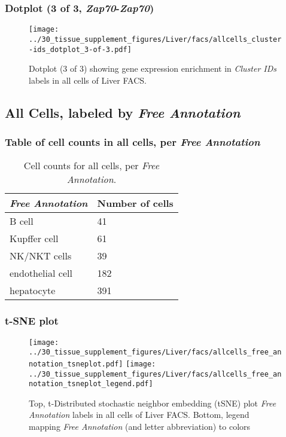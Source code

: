 \clearpage

\subsubsection{Dotplot (3 of 3, \emph{Zap70}-\emph{Zap70})}
\begin{figure}[h]
\centering
\texttt{[image: ../30\_tissue\_supplement\_figures/Liver/facs/allcells\_cluster-ids\_dotplot\_3-of-3.pdf]}

\caption{ Dotplot (3 of 3)  showing gene expression enrichment in \emph{Cluster IDs} labels in all cells of Liver FACS. }
\end{figure}


\clearpage

\subsection{All Cells, labeled by \emph{Free Annotation}}
\subsubsection{Table of cell counts in all cells, per \emph{Free Annotation}}\begin{table}[h]
\centering
\label{my-label}
\begin{tabular}{@{}ll@{}}
\toprule

\emph{Free Annotation}& Number of cells \\ \midrule
B cell & 41 \\

Kupffer cell & 61 \\

NK/NKT cells & 39 \\

endothelial cell & 182 \\

hepatocyte & 391 \\
\bottomrule
\end{tabular}
\caption{Cell counts for all cells, per \emph{Free Annotation}.}
\end{table}

\clearpage
\subsubsection{t-SNE plot}
\begin{figure}[h]
\centering
\texttt{[image: ../30\_tissue\_supplement\_figures/Liver/facs/allcells\_free\_annotation\_tsneplot.pdf]}
\texttt{[image: ../30\_tissue\_supplement\_figures/Liver/facs/allcells\_free\_annotation\_tsneplot\_legend.pdf]}
\caption{Top, t-Distributed stochastic neighbor embedding (tSNE) plot  \emph{Free Annotation} labels in all cells of Liver FACS. Bottom, legend mapping \emph{Free Annotation} (and letter abbreviation) to colors}
\end{figure}



